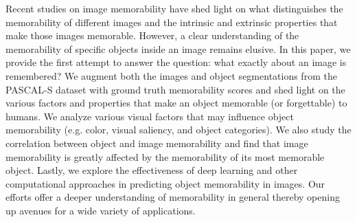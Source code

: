 Recent studies on image memorability have shed light on what distinguishes the memorability of different images and the intrinsic and extrinsic properties that make those images memorable. However, a clear understanding of the memorability of specific objects inside an image remains elusive. In this paper, we provide the first attempt to answer the question: what exactly about an image is remembered? We augment both the images and object segmentations from the PASCAL-S dataset with ground truth memorability scores and shed light on the various factors and properties that make an object memorable (or forgettable) to humans. We analyze various visual factors that may influence object memorability (e.g. color, visual saliency, and object categories). We also study the correlation between object and image memorability and find that image memorability is greatly affected by the memorability of its most memorable object. Lastly, we explore the effectiveness of deep learning and other computational approaches in predicting object memorability in images. Our efforts offer a deeper understanding of memorability in general thereby opening up avenues for a wide variety of applications.

